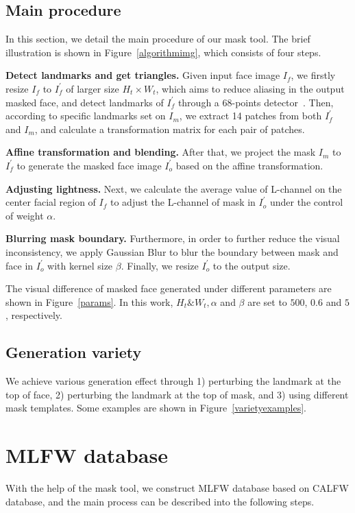 \documentclass[final]{cvpr}
\begin{document}
\subsection{Main procedure}
In this section, we detail the main procedure of our mask tool. The brief illustration is shown in Figure~\ref{algorithmimg}, which consists of four steps.

\textbf{Detect landmarks and get triangles.} Given input face image $I_f$, we firstly resize $I_f$ to $I_{f}^{'}$ of larger size $H_{t} \times W_{t}$, which aims to reduce aliasing in the output masked face, and detect landmarks of $I_f^{'}$ through a 68-points detector~\cite{bulat2017far}.
Then, according to specific landmarks set on $I_m$, we extract 14 patches from both $I_{f}^{'}$ and $I_m$, and calculate a transformation matrix for each pair of patches.

\textbf{Affine transformation and blending.} After that, we project the mask $I_m$ to $I_f^{'}$ to generate the masked face image $I_o^{'}$ based on the affine transformation.

\textbf{Adjusting lightness.} Next, we calculate the average value of L-channel on the center facial region of $I_f$ to adjust the L-channel of mask in $I_o^{'}$ under the control of weight $\alpha$.

\textbf{Blurring mask boundary.} Furthermore, in order to further reduce the visual inconsistency, we apply Gaussian Blur to blur the boundary between mask and face in $I_o^{'}$ with kernel size $\beta$.
Finally, we resize $I_o^{'}$ to the output size.

The visual difference of masked face generated under different parameters are shown in Figure~\ref{params}. In this work, $H_{t} \& W_{t}, \alpha$ and $\beta$ are set to $500$, $0.6$ and $5$, respectively.

\subsection{Generation variety}
We achieve various generation effect through 1) perturbing the landmark at the top of face, 2) perturbing the landmark at the top of mask, and 3) using different mask templates.
Some examples are shown in Figure~\ref{varietyexamples}.


\section{MLFW database}

With the help of the mask tool, we construct MLFW database based on CALFW database, and the main process can be described into the following steps.
\end{document}

